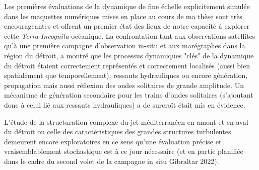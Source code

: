 

Les premières évaluations de la dynamique de fine échelle explicitement simulée dans les maquettes numériques mises en place au cours de ma thèse sont très encourageantes et offrent un premier état des lieux de notre capacité à explorer cette \textit{Terra Incognita} océanique. La confrontation tant aux observations satellites qu'à une première campagne d'observation in-situ et aux marégraphes dans la région du détroit, a montré que les processus dynamiques "clés" de la dynamique du détroit étaient correctement représentés et correctement localisés (aussi bien spatialement que temporellement): ressauts hydrauliques ou encore génération, propagation mais aussi réflexion des ondes solitaires de grande amplitude. Un mécanisme de génération secondaire pour les trains d'ondes solitaires (s'ajoutant donc à celui lié aux ressauts hydrauliques) a de surcroît était mis en évidence.

\color{blue}L'étude de la structuration complexe du jet méditerranéen en amont et en aval du détroit ou celle des caractéristiques des grandes structures turbulentes demeurent encore exploratoires en ce sens qu'une évaluation précise et vraisemblablement stochastique est à ce jour nécessaire (et en partie planifiée dans le cadre du second volet de la campagne in situ Gibraltar 2022).\color{black}\\

